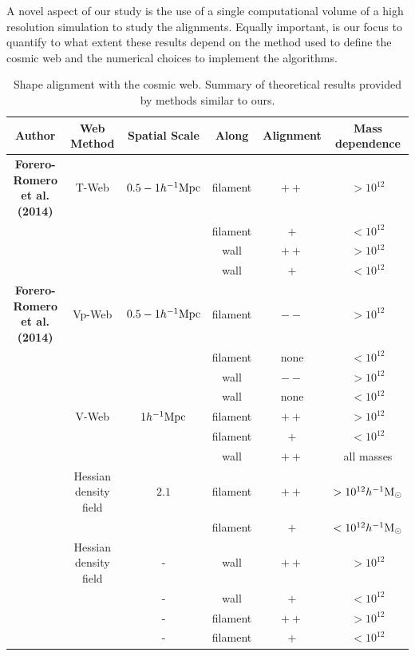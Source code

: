 \documentclass[useAMS,usenatbib]{mn2e}
\newcommand{\hMpc}{{\ifmmode{h^{-1}{\rm Mpc}}\else{$h^{-1}$Mpc }\fi}}
\newcommand{\hMsun}{{\ifmmode{h^{-1}{\rm
        {M_{\odot}}}}\else{$h^{-1}{\rm{M_{\odot}}}$~}\fi}}
\begin{document}
A novel aspect of our study is the use of a
single computational volume of a high resolution simulation to study
the alignments. Equally important, is our focus to quantify to what
extent  these results depend on the method used to define the cosmic
web and the numerical choices to implement the algorithms.  



\begin{table}
\begin{tabular}{cccccc}\hline\hline
Author & Web Method & Spatial Scale & Along &
Alignment & Mass dependence\\\hline

{\bf Forero-Romero et al. (2014)} & T-Web & $0.5-1 \hMpc$ & 
filament &$++$ & $>10^{12}$\hMsun\\
&   & & 
filament & $+$ & $<10^{12}$\hMsun\\

&   & & 
wall & $++$ & $>10^{12}$\hMsun\\

&   & & 
wall & $+$ & $<10^{12}$\hMsun\\\hline

{\bf Forero-Romero et al. (2014)} & Vp-Web & $0.5-1 \hMpc$ & 
filament &$--$ & $>10^{12}$\hMsun\\
&   & & 
filament & none & $<10^{12}$\hMsun\\
&   & & 
wall & $--$ & $>10^{12}$\hMsun\\

&   & & 
wall & none & $<10^{12}$\hMsun\\\hline


\cite{Libeskind2013} & V-Web & $1 \hMpc$ & 
filament &$++$ & $>10^{12}$\hMsun\\
&   & & 
filament &$+$ & $<10^{12}$\hMsun\\
&   & & 
wall & $++$ & all masses\\\hline

\cite{Zhang2009}  & Hessian density field &  $2.1$\hMpc & 
filament & $++$ & $>10^{12}\hMsun$\\

& &  & 
filament & $+$ & $<10^{12}\hMsun$\\\hline

\cite{AragonCalvo2007} & Hessian density field & - &
wall & $++$ & $>10^{12}$\hMsun\\

& & - &
wall & $+$ & $<10^{12}$\hMsun\\

& & - &
filament& $++$ & $>10^{12}$\hMsun\\

& & - &
filament& $+$ & $<10^{12}$\hMsun\\\hline \hline

\end{tabular}\\
\caption{Shape alignment with the cosmic web. Summary of theoretical
  results provided by methods similar to ours.}
\end{table}
\end{document}
